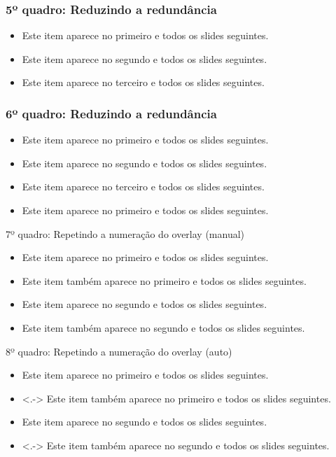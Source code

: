 \documentclass{beamer}
\begin{document}
\begin{frame}
    \frametitle{5º quadro: Reduzindo a redundância}
    \begin{itemize}[<+->]
        \item Este item aparece no primeiro e todos os slides seguintes.
        \item Este item aparece no segundo e todos os slides seguintes.
        \item Este item aparece no terceiro e todos os slides seguintes.
    \end{itemize}
\end{frame}

\begin{frame}
    \frametitle{6º quadro: Reduzindo a redundância}
    \begin{itemize}[<+->]
        \item Este item aparece no primeiro e todos os slides seguintes.
        \item Este item aparece no segundo e todos os slides seguintes.
        \item Este item aparece no terceiro e todos os slides seguintes.
        \item<1-> Este item aparece no primeiro e todos os slides seguintes.
    \end{itemize}
\end{frame}

\begin{frame}{7º quadro: Repetindo a numeração do overlay (manual)}
    \begin{itemize}
        \item<1-> Este item aparece no primeiro e todos os slides seguintes.
        \item<1-> Este item também aparece no primeiro e todos os slides seguintes.
        \item<2-> Este item aparece no segundo e todos os slides seguintes.
        \item<2-> Este item também aparece no segundo e todos os slides seguintes.
    \end{itemize}
\end{frame}

\begin{frame}{8º quadro: Repetindo a numeração do overlay (auto)}
    
    \begin{itemize}
        \item<+-> Este item aparece no primeiro e todos os slides seguintes.
        \item<.-> Este item também aparece no primeiro e todos os slides seguintes.
        \item<+-> Este item aparece no segundo e todos os slides seguintes.
        \item<.-> Este item também aparece no segundo e todos os slides seguintes.
    \end{itemize}
\end{frame}
\end{document}
